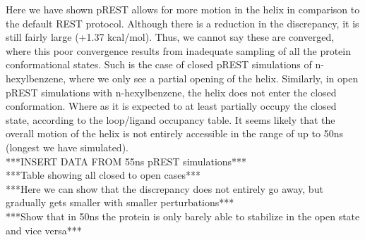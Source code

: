 \documentclass{article}
\begin{document}
Here we have shown pREST allows for more motion in the helix in comparison to the default REST protocol.
Although there is a reduction in the discrepancy, it is still fairly large (+1.37 kcal/mol).
Thus, we cannot say these are converged, where this poor convergence results from inadequate sampling of all the protein conformational states.
Such is the case of closed pREST simulations of n-hexylbenzene, where we only see a partial opening of the helix.
Similarly, in open pREST simulations with n-hexylbenzene, the helix does not enter the closed conformation.
Where as it is expected to at least partially occupy the closed state, according to the loop/ligand occupancy table.
It seems likely that the overall motion of the helix is not entirely accessible in the range of up to 50ns (longest we have simulated).\\

***INSERT DATA FROM 55ns pREST simulations***\\ %
***Table showing all closed to open cases***\\
***Here we can show that the discrepancy does not entirely go away, but gradually gets smaller with smaller perturbations***\\
***Show that in 50ns the protein is only barely able to stabilize in the open state and vice versa***\\
\end{document}
